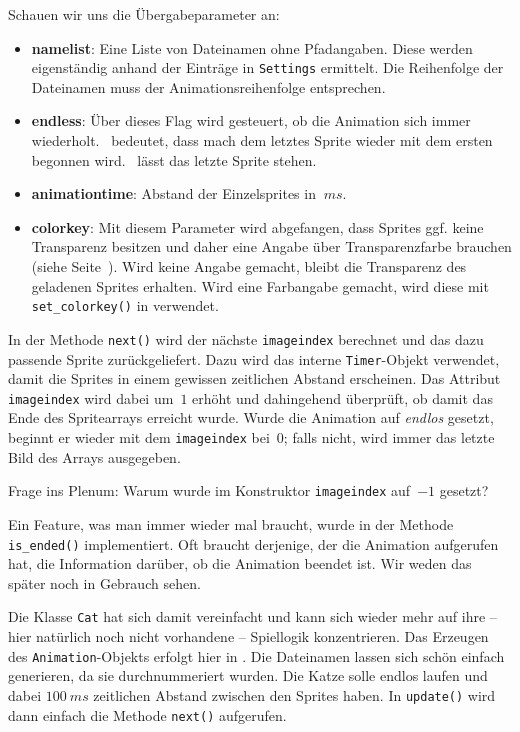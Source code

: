 Schauen wir uns die Übergabeparameter an: 
\begin{itemize}
    \item \textbf{namelist}: Eine Liste von Dateinamen ohne Pfadangaben. Diese werden eigenständig anhand der Einträge in \texttt{Settings} ermittelt. Die Reihenfolge der Dateinamen muss der Animationsreihenfolge entsprechen.

    \item \textbf{endless}: Über dieses Flag wird gesteuert, ob die Animation sich immer wiederholt. \true\ bedeutet, dass mach dem letztes Sprite wieder mit dem ersten begonnen wird. \false\ lässt das letzte Sprite stehen.

    \item \textbf{animationtime}: Abstand der Einzelsprites in $~ms$.

    \item \textbf{colorkey}: Mit diesem Parameter wird abgefangen, dass Sprites ggf. keine Transparenz besitzen und daher eine Angabe über Transparenzfarbe brauchen (siehe Seite~\pageref{pageTransparenz}). Wird keine Angabe gemacht, bleibt die Transparenz des geladenen Sprites erhalten. Wird eine Farbangabe gemacht, wird diese mit \texttt{set\_colorkey()} in  verwendet.
\end{itemize}

In der Methode \texttt{next()} wird der nächste \texttt{imageindex} berechnet und das dazu passende Sprite zurückgeliefert. Dazu wird das interne \texttt{Timer}-Objekt verwendet, damit die Sprites in einem gewissen zeitlichen Abstand erscheinen. Das Attribut \texttt{imageindex} wird dabei um~$1$ erhöht und dahingehend überprüft, ob damit das Ende des Spritearrays erreicht wurde. Wurde die Animation auf \emph{endlos} gesetzt, beginnt er wieder mit dem \texttt{imageindex} bei~$0$; falls nicht, wird immer das letzte Bild des Arrays ausgegeben.

Frage ins Plenum: Warum wurde im Konstruktor \texttt{imageindex} auf~$-1$ gesetzt?

Ein Feature, was man immer wieder mal braucht, wurde in der Methode \texttt{is\_ended()} implementiert. Oft braucht derjenige, der die Animation aufgerufen hat, die Information darüber, ob die Animation beendet ist. Wir weden das später noch in Gebrauch sehen.


Die Klasse \texttt{Cat} hat sich damit vereinfacht und kann sich wieder mehr auf ihre -- hier natürlich noch nicht vorhandene -- Spiellogik konzentrieren. Das Erzeugen des \texttt{Animation}-Objekts erfolgt hier in . Die Dateinamen lassen sich schön einfach generieren, da sie durchnummeriert wurden. Die Katze solle endlos laufen und dabei $100~ms$ zeitlichen Abstand zwischen den Sprites haben. In \texttt{update()} wird dann einfach die Methode \texttt{next()} aufgerufen.
\newpage

